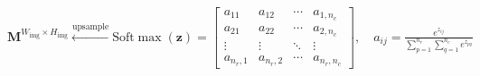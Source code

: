 ${{\mathbf{M}}^{{W_{{\text{img}}}} \times {H_{{\text{img}}}}}}\xleftarrow{{{\text{upsample}}}}{\text{Soft}}\max \left( {\mathbf{z}} \right) = \left[ {\begin{array}{*{20}{c}}{{a_{11}}}&{{a_{12}}}& \cdots &{{a_{1,{n_c}}}} \\ {{a_{21}}}&{{a_{22}}}& \cdots &{{a_{2,{n_c}}}} \\ \vdots & \vdots & \ddots & \vdots \\ {{a_{{n_r},1}}}&{{a_{{n_r},2}}}& \cdots &{{a_{{n_r},{n_c}}}} \end{array}} \right],\quad {a_{ij}} = \frac{{{e^{{z_{ij}}}}}}{{\sum\limits_{p = 1}^{{n_r}} {\sum\limits_{q = 1}^{{n_c}} {{e^{{z_{pq}}}}} } }}$
